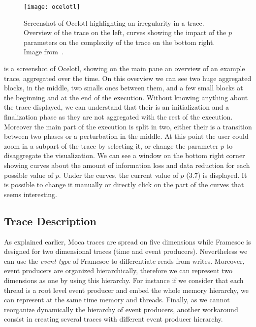 \begin{figure}[htb]
    \centering
    \texttt{[image: ocelotl]}
    \caption[Screenshot of Ocelotl.]{
        Screenshot of Ocelotl highlighting an irregularity in a trace.\\
        Overview of the trace on the left, curves showing the impact of the $p$ parameters on the complexity of the trace on the bottom right.\\
        Image from~\cite{Dosimont14Ocelotl}.}
    \label{fig:ocelotl-overview}
\end{figure}

 is a screenshot of \gls{Ocelotl}, showing on the main pane an overview of an example trace, aggregated over the time.
On this overview we can see two huge aggregated blocks, in the middle, two smalls ones between them, and a few small blocks at the beginning and at the end of the execution.
Without knowing anything about the trace displayed, we can understand that their is an initialization and a finalization phase as they are not aggregated with the rest of the execution.
Moreover the main part of the execution is split in two, either their is a transition between two phases or a perturbation in the middle.
At this point the user could zoom in a subpart of the trace by selecting it, or change the parameter $p$ to disaggregate the visualization.
We can see a window on the bottom right corner showing curves about the  amount of information loss and data reduction for each possible value of $p$.
Under the curves, the current value of $p$ ($3.7$) is displayed.
It is possible to change it manually or directly click on the part of the curves that seems interesting.


\subsection{Trace Description}

As explained earlier, \gls{Moca} traces are spread on five dimensions while \gls{Framesoc} is designed for two dimensional traces (time and event producers).
Nevertheless we can use the \emph{event type} of \gls{Framesoc} to differentiate reads from writes.
Moreover, event producers are organized hierarchically, therefore we can represent two dimensions as one by using this hierarchy.
For instance if we consider that each thread is a root level event producer and embed the whole memory hierarchy, we can represent at the same time memory and threads.
Finally, as we cannot reorganize dynamically the hierarchy of event producers, another workaround consist in creating several traces with different event producer hierarchy.

